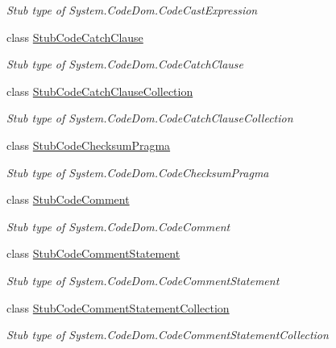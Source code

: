 \begin{DoxyCompactItemize}
\begin{DoxyCompactList}\small\item\em Stub type of System.\-Code\-Dom.\-Code\-Cast\-Expression\end{DoxyCompactList}\item 
class \hyperlink{class_system_1_1_code_dom_1_1_fakes_1_1_stub_code_catch_clause}{Stub\-Code\-Catch\-Clause}
\begin{DoxyCompactList}\small\item\em Stub type of System.\-Code\-Dom.\-Code\-Catch\-Clause\end{DoxyCompactList}\item 
class \hyperlink{class_system_1_1_code_dom_1_1_fakes_1_1_stub_code_catch_clause_collection}{Stub\-Code\-Catch\-Clause\-Collection}
\begin{DoxyCompactList}\small\item\em Stub type of System.\-Code\-Dom.\-Code\-Catch\-Clause\-Collection\end{DoxyCompactList}\item 
class \hyperlink{class_system_1_1_code_dom_1_1_fakes_1_1_stub_code_checksum_pragma}{Stub\-Code\-Checksum\-Pragma}
\begin{DoxyCompactList}\small\item\em Stub type of System.\-Code\-Dom.\-Code\-Checksum\-Pragma\end{DoxyCompactList}\item 
class \hyperlink{class_system_1_1_code_dom_1_1_fakes_1_1_stub_code_comment}{Stub\-Code\-Comment}
\begin{DoxyCompactList}\small\item\em Stub type of System.\-Code\-Dom.\-Code\-Comment\end{DoxyCompactList}\item 
class \hyperlink{class_system_1_1_code_dom_1_1_fakes_1_1_stub_code_comment_statement}{Stub\-Code\-Comment\-Statement}
\begin{DoxyCompactList}\small\item\em Stub type of System.\-Code\-Dom.\-Code\-Comment\-Statement\end{DoxyCompactList}\item 
class \hyperlink{class_system_1_1_code_dom_1_1_fakes_1_1_stub_code_comment_statement_collection}{Stub\-Code\-Comment\-Statement\-Collection}
\begin{DoxyCompactList}\small\item\em Stub type of System.\-Code\-Dom.\-Code\-Comment\-Statement\-Collection\end{DoxyCompactList}\item 

\end{DoxyCompactItemize}
